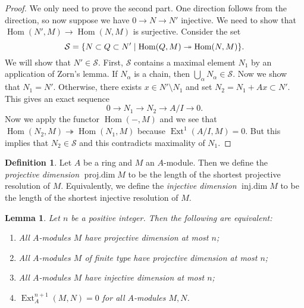 \documentclass[leqno, openany]{memoir}
\newtheorem{lem}[thm]{Lemma}
\theoremstyle{definition}
\newtheorem{defn}[thm]{Definition}
\theoremstyle{remark}
\theoremstyle{plain}
\theoremstyle{definition}
\theoremstyle{remark}
\newcommand{\mc}[1]{\mathcal{#1}}
\DeclareMathOperator{\Hom}{Hom}
\DeclareMathOperator{\Ext}{Ext}
\begin{document}
\begin{proof}
    We only need to prove the second part. One direction follows from the direction, so now suppose we have $0 \to N \to N'$ injective. We need to show that $\Hom(N',M) \to \Hom(N,M)$ is surjective. Consider the set 
    \[ \mc{S} = \qty{N \subset Q \subset N' \mid \Hom(Q,M) \twoheadrightarrow \Hom(N,M)}. \]
    We will show that $N' \in \mc{S}$. First, $\mc{S}$ contains a maximal element $N_1$ by an application of Zorn's lemma. If $N_{\alpha}$ is a chain, then $\bigcup_{\alpha} N_{\alpha} \in \mc{S}$. Now we show that $N_1 = N'$. Otherwise, there exists $x \in N' \setminus N_1$ and set $N_2 = N_1 + Ax \subset N'$. This gives an exact sequence
    \[ 0 \to N_1 \to N_2 \to A/I \to 0. \]
    Now we apply the functor $\Hom(-,M)$ and we see that $\Hom(N_2, M) \twoheadrightarrow \Hom(N_1, M)$ because $\Ext^1(A/I, M) = 0$. But this implies that $N_2 \in \mc{S}$ and this contradicts maximality of $N_1$.
\end{proof}

\begin{defn}
    Let $A$ be a ring and $M$ an $A$-module. Then we define the \textit{projective dimension} $\operatorname{proj.dim} M$ to be the length of the shortest projective resolution of $M$. Equivalently, we define the \textit{injective dimension} $\operatorname{inj.dim} M$ to be the length of the shortest injective resolution of $M$. 
\end{defn}

\begin{lem}
    Let $n$ be a positive integer. Then the following are equivalent:
    \begin{enumerate}
        \item All $A$-modules $M$ have projective dimension at most $n$;
        \item All $A$-modules $M$ of finite type have projective dimension at most $n$;
        \item All $A$-modules $M$ have injective dimension at most $n$;
        \item $\Ext_A^{n+1}(M,N) = 0$ for all $A$-modules $M,N$.
    \end{enumerate}
\end{lem}
\end{document}
